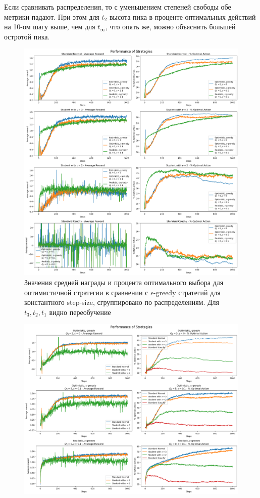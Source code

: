 \documentclass{article}
\begin{document}
\begin{enumerate}
    Если сравнивать распределения, то с уменьшением степеней свободы обе метрики падают. При этом для $t_2$ высота пика в проценте оптимальных действий на 10-ом шагу выше, чем для $t_{\infty}$, что опять же, можно объяснить большей остротой пика.
    \begin{figure}
        \centering
        \includegraphics[width=1.1\linewidth]{optimistic_1.jpg}
        \caption{\label{fig:optimistic_1}Значения средней награды и процента оптимального выбора для оптимистичной стратегии в сравнении с $\epsilon$-greedy стратегий для константного step-size, сгруппировано по распределениям. Для $t_3, t_2, t_1$ видно переобучение}
    \end{figure}
    \begin{figure}[t]
        \includegraphics[width=1.1\linewidth]{optimistic_2.jpg}

\end{figure}
\end{enumerate}
\end{document}
